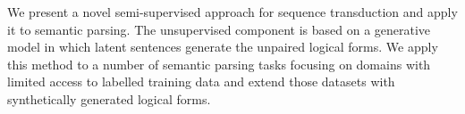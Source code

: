 We present a novel semi-supervised approach for sequence transduction and apply it to semantic parsing. The unsupervised component is based on a generative model in which latent sentences generate the unpaired logical forms. We apply this method to a number of semantic parsing tasks focusing on domains with limited access to labelled training data and extend those datasets with synthetically generated logical forms.
